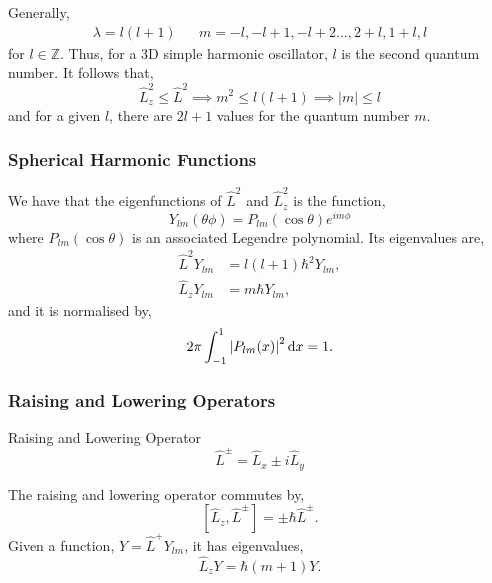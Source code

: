 \documentclass{book}
\begin{document}
Generally,
\begin{align}
	\lambda = l(l+1) && m = -l, -l+1, -l + 2 \ldots, 2 + l, 1 + l, l
\end{align}
for $l \in \mathbb{Z}$. Thus, for a 3D simple harmonic oscillator, $l$ is the second quantum number. It follows that,
\begin{equation}
	\hat{L}_z^2 \leq \hat{L}^2 \implies m^2 \leq l(l+1) \implies |m| \leq l
\end{equation}
and for a given $l$, there are $2l + 1$ values for the quantum number $m$.
\subsubsection{Spherical Harmonic Functions}
We have that the eigenfunctions of $\hat{L}^2$ and $\hat{L}_z^2$ is the function, 
\begin{equation}
	Y_{lm}(\theta\phi) = P_{lm}(\cos\theta) e^{im\phi}
\end{equation}
where $P_{lm}(\cos\theta)$ is an associated Legendre polynomial. Its eigenvalues are,
\begin{align}
	\hat{L}^2Y_{lm} & = l(l+1)\hbar^2 Y_{lm}, \\
	\hat{L}_z Y_{lm} & = m\hbar Y_{lm},
\end{align}
and it is normalised by,
\begin{equation}
	2\pi \int_{-1}^{1}\abs{P_{lm}(x)}^2 \dd{x} = 1.
\end{equation}
\subsubsection{Raising and Lowering Operators}
\begin{Definitions}{Raising and Lowering Operator}{}
	\begin{equation}
		\hat{L}^{\pm} = \hat{L}_x \pm i \hat{L}_y
	\end{equation}
\end{Definitions}
The raising and lowering operator commutes by,
\begin{equation}
	\left[\hat{L}_z, \hat{L}^{\pm}\right] = \pm \hbar \hat{L}^{\pm}.
\end{equation}
Given a function, $Y = \hat{L}^+Y_{lm}$, it has eigenvalues,
\begin{equation}
	\hat{L}_zY = \hbar(m+1)Y.
\end{equation}
\end{document}
